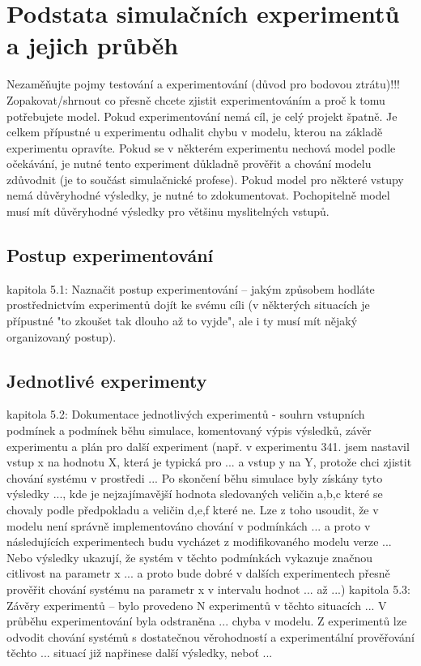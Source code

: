 \documentclass[a4paper,11pt]{article}
\begin{document}
\section{Podstata simulačních experimentů a jejich průběh}

Nezaměňujte pojmy testování a experimentování (důvod pro bodovou ztrátu)!!!
Zopakovat/shrnout co přesně chcete zjistit experimentováním a proč k tomu potřebujete model. Pokud experimentování nemá cíl, je celý projekt špatně. Je celkem přípustné u experimentu odhalit chybu v modelu, kterou na základě experimentu opravíte. Pokud se v některém experimentu nechová model podle očekávání, je nutné tento experiment důkladně prověřit a chování modelu zdůvodnit (je to součást simulačnické profese). Pokud model pro některé vstupy nemá důvěryhodné výsledky, je nutné to zdokumentovat. Pochopitelně model musí mít důvěryhodné výsledky pro většinu myslitelných vstupů.
\subsection{Postup experimentování}

kapitola 5.1: Naznačit postup experimentování – jakým způsobem hodláte prostřednictvím experimentů dojít ke svému cíli (v některých situacích je přípustné "to zkoušet tak dlouho až to vyjde", ale i ty musí mít nějaký organizovaný postup).
\subsection{Jednotlivé experimenty}
kapitola 5.2: Dokumentace jednotlivých experimentů - souhrn vstupních podmínek a podmínek běhu simulace, komentovaný výpis výsledků, závěr experimentu a plán pro další experiment (např. v experimentu 341. jsem nastavil vstup x na hodnotu X, která je typická pro ... a vstup y na Y, protože chci zjistit chování systému v prostředi ... Po skončení běhu simulace byly získány tyto výsledky ..., kde je nejzajímavější hodnota sledovaných veličin a,b,c které se chovaly podle předpokladu a veličin d,e,f které ne. Lze z toho usoudit, že v modelu není správně implementováno chování v podmínkách ... a proto v následujících experimentech budu vycházet z modifikovaného modelu verze ... Nebo výsledky ukazují, že systém v těchto podmínkách vykazuje značnou citlivost na parametr x ... a proto bude dobré v dalších experimentech přesně prověřit chování systému na parametr x v intervalu hodnot ... až ...)
kapitola 5.3: Závěry experimentů – bylo provedeno N experimentů v těchto situacích ... V průběhu experimentování byla odstraněna ... chyba v modelu. Z experimentů lze odvodit chování systémů s dostatečnou věrohodností a experimentální prověřování těchto ... situací již napřinese další výsledky, neboť ...
\end{document}
